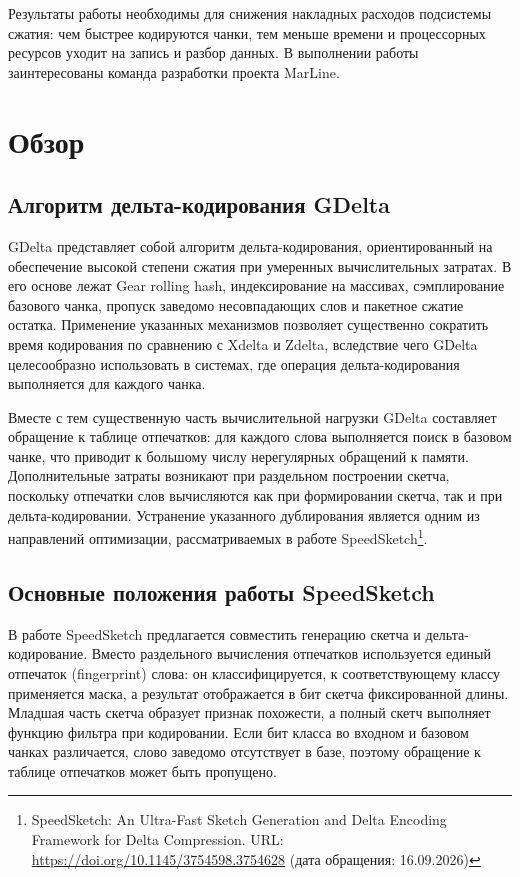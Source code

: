 \documentclass[a4paper]{article}
\begin{document}
Результаты работы необходимы для снижения накладных расходов подсистемы сжатия: чем быстрее кодируются чанки, тем меньше времени и процессорных ресурсов уходит на запись и разбор данных. В выполнении работы заинтересованы команда разработки проекта MarLine.

\section{Обзор}

\subsection{Алгоритм дельта-кодирования GDelta}

GDelta представляет собой алгоритм дельта-кодирования, ориентированный на обеспечение высокой степени сжатия при умеренных вычислительных затратах. В его основе лежат Gear rolling hash, индексирование на массивах, сэмплирование базового чанка, пропуск заведомо несовпадающих слов и пакетное сжатие остатка. Применение указанных механизмов позволяет существенно сократить время кодирования по сравнению с Xdelta и Zdelta, вследствие чего GDelta целесообразно использовать в системах, где операция дельта-кодирования выполняется для каждого чанка.

Вместе с тем существенную часть вычислительной нагрузки GDelta составляет обращение к таблице отпечатков: для каждого слова выполняется поиск в базовом чанке, что приводит к большому числу нерегулярных обращений к памяти. Дополнительные затраты возникают при раздельном построении скетча, поскольку отпечатки слов вычисляются как при формировании скетча, так и при дельта-кодировании. Устранение указанного дублирования является одним из направлений оптимизации, рассматриваемых в работе SpeedSketch\footnote{SpeedSketch: An Ultra-Fast Sketch Generation and Delta Encoding Framework for Delta Compression. URL: \url{https://doi.org/10.1145/3754598.3754628} (дата обращения: 16.09.2026)}.

\subsection{Основные положения работы SpeedSketch}

В работе SpeedSketch предлагается совместить генерацию скетча и дельта-кодирование. Вместо раздельного вычисления отпечатков используется единый отпечаток (fingerprint) слова: он классифицируется, к соответствующему классу применяется маска, а результат отображается в бит скетча фиксированной длины. Младшая часть скетча образует признак похожести, а полный скетч выполняет функцию фильтра при кодировании. Если бит класса во входном и базовом чанках различается, слово заведомо отсутствует в базе, поэтому обращение к таблице отпечатков может быть пропущено.
\end{document}
